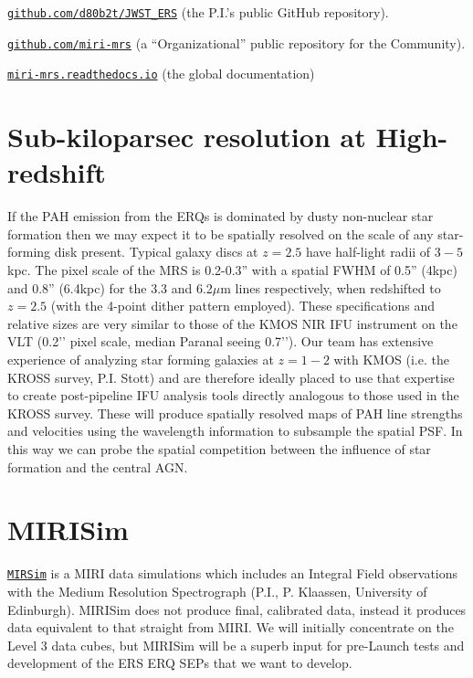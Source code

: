 \vspace{4pt}
\noindent
\href{https://github.com/d80b2t/JWST\_ERS}{{\tt github.com/d80b2t/JWST\_ERS}} (the P.I.'s public GitHub repository).
\vspace{4pt}

\noindent
\href{https://github.com/miri-mrs}{{\tt github.com/miri-mrs}} (a ``Organizational'' public repository for the Community).
\vspace{4pt}

\noindent
\href{http://miri-mrs.readthedocs.io/en/latest/}{{\tt miri-mrs.readthedocs.io}} (the global documentation)


\vspace{-6pt}
\section*{Sub-kiloparsec resolution at High-redshift}
\vspace{-6pt}
If the PAH emission from the ERQs is dominated by dusty non-nuclear
star formation then we may expect it to be spatially resolved on the
scale of any star-forming disk present. Typical galaxy discs at $z=2.5$
have half-light radii of $3-5$kpc. The pixel scale of the MRS is 0.2-0.3''  
with a spatial FWHM of 0.5'' (4kpc) and 0.8'' (6.4kpc) for the 3.3 and 6.2$\mu$m lines
respectively, when redshifted to $z=2.5$ (with the 4-point dither
pattern employed). These specifications and relative sizes are very
similar to those of the KMOS NIR IFU instrument on the VLT (0.2’’
pixel scale, median Paranal seeing 0.7’’). Our team has extensive
experience of analyzing star forming galaxies at $z=1-2$ with KMOS
(i.e. the KROSS survey, P.I. Stott) and are
therefore ideally placed to use that expertise to create post-pipeline
IFU analysis tools directly analogous to those used in the KROSS
survey. These will produce spatially resolved maps of PAH line
strengths and velocities using the wavelength information to subsample
the spatial PSF. In this way we can probe the spatial competition
between the influence of star formation and the central AGN.

\section*{MIRISim}
\vspace{-6pt}
\href{http://www.miricle.org/MIRICLE2/devel/doc/mirisim/User_Guide/index.html}
{\tt MIRSim} is a MIRI data simulations which includes an Integral
Field observations with the Medium Resolution Spectrograph (P.I., P. Klaassen, 
University of Edinburgh).  MIRISim does not
produce final, calibrated data, instead it produces data equivalent to
that straight from MIRI. We will initially concentrate on the Level 3
data cubes, but MIRISim will be a superb input for pre-Launch tests
and development of the ERS ERQ SEPs that we want to develop.  


